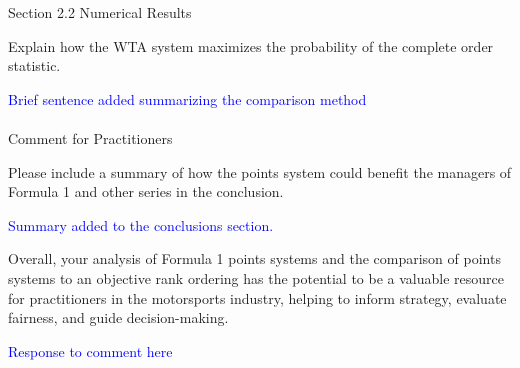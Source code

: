 \documentclass[12pt]{article}
\begin{document}
Section 2.2 Numerical Results

Explain how the WTA system maximizes the probability of the complete
order statistic.

\textcolor{blue}{Brief sentence added summarizing the comparison
  method}\\ \\


Comment for Practitioners

Please include a summary of how the points system could benefit the
managers of Formula 1 and other series in the conclusion.

\textcolor{blue}{Summary added to the conclusions section.}

Overall, your analysis of Formula 1 points systems and the comparison
of points systems to an objective rank ordering has the potential to
be a valuable resource for practitioners in the motorsports industry,
helping to inform strategy, evaluate fairness, and guide
decision-making.



\textcolor{blue}{Response to comment here}\\ \\
\end{document}
